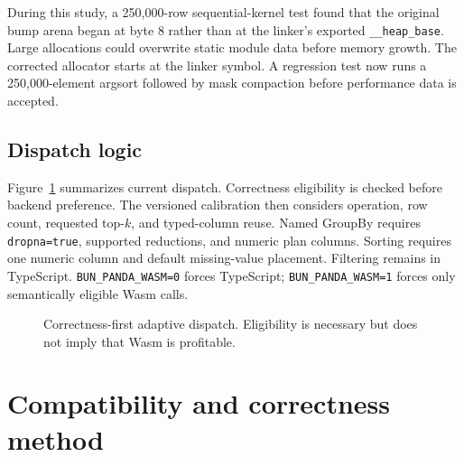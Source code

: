 \documentclass[pdflatex,sn-basic,Numbered]{sn-jnl}
\begin{document}
During this study, a 250,000-row sequential-kernel test found that the original bump arena began at byte 8 rather than at the linker's exported \texttt{\_\_heap\_base}. Large allocations could overwrite static module data before memory growth. The corrected allocator starts at the linker symbol. A regression test now runs a 250,000-element argsort followed by mask compaction before performance data is accepted.

\subsection{Dispatch logic}

Figure~\ref{fig:dispatch} summarizes current dispatch. Correctness eligibility is checked before backend preference. The versioned calibration then considers operation, row count, requested top-$k$, and typed-column reuse. Named GroupBy requires \texttt{dropna=true}, supported reductions, and numeric plan columns. Sorting requires one numeric column and default missing-value placement. Filtering remains in TypeScript. \texttt{BUN\_PANDA\_WASM=0} forces TypeScript; \texttt{BUN\_PANDA\_WASM=1} forces only semantically eligible Wasm calls.

\begin{figure}[t]
\centering
{}
\caption{Correctness-first adaptive dispatch. Eligibility is necessary but does not imply that Wasm is profitable.}\label{fig:dispatch}
\end{figure}

\section{Compatibility and correctness method}\label{sec:compatibility}
\end{document}

